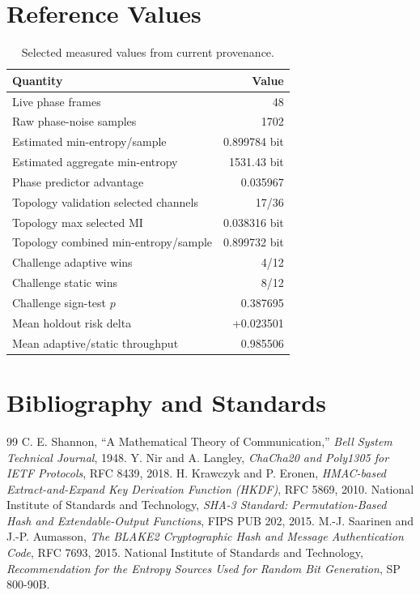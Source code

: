 \chapter{Reference Values}
\begin{table}[ht]
\centering\small
\caption{Selected measured values from current provenance.}
\begin{tabular}{lr}
\toprule
Quantity & Value\\
\midrule
Live phase frames & 48\\
Raw phase-noise samples & 1702\\
Estimated min-entropy/sample & 0.899784 bit\\
Estimated aggregate min-entropy & 1531.43 bit\\
Phase predictor advantage & 0.035967\\
Topology validation selected channels & 17/36\\
Topology max selected MI & 0.038316 bit\\
Topology combined min-entropy/sample & 0.899732 bit\\
Challenge adaptive wins & 4/12\\
Challenge static wins & 8/12\\
Challenge sign-test $p$ & 0.387695\\
Mean holdout risk delta & +0.023501\\
Mean adaptive/static throughput & 0.985506\\
\bottomrule
\end{tabular}
\end{table}

\chapter{Bibliography and Standards}
\begin{thebibliography}{99}
 C. E. Shannon, ``A Mathematical Theory of Communication,'' \emph{Bell System Technical Journal}, 1948.
 Y. Nir and A. Langley, \emph{ChaCha20 and Poly1305 for IETF Protocols}, RFC 8439, 2018.
 H. Krawczyk and P. Eronen, \emph{HMAC-based Extract-and-Expand Key Derivation Function (HKDF)}, RFC 5869, 2010.
 National Institute of Standards and Technology, \emph{SHA-3 Standard: Permutation-Based Hash and Extendable-Output Functions}, FIPS PUB 202, 2015.
 M.-J. Saarinen and J.-P. Aumasson, \emph{The BLAKE2 Cryptographic Hash and Message Authentication Code}, RFC 7693, 2015.
 National Institute of Standards and Technology, \emph{Recommendation for the Entropy Sources Used for Random Bit Generation}, SP 800-90B.
\end{thebibliography}

